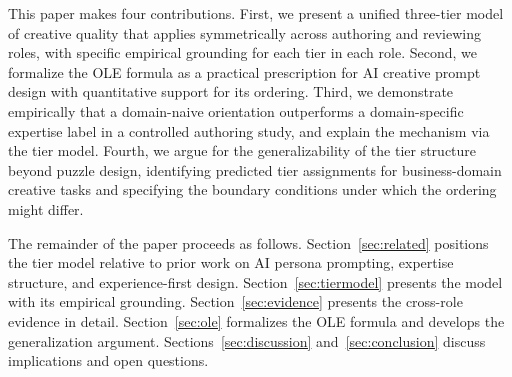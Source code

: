 This paper makes four contributions. First, we present a unified three-tier model of
creative quality that applies symmetrically across authoring and reviewing roles, with
specific empirical grounding for each tier in each role. Second, we formalize the OLE
formula as a practical prescription for AI creative prompt design with quantitative
support for its ordering. Third, we demonstrate empirically that a domain-naive
orientation outperforms a domain-specific expertise label in a controlled authoring
study, and explain the mechanism via the tier model. Fourth, we argue for the
generalizability of the tier structure beyond puzzle design, identifying predicted tier
assignments for business-domain creative tasks and specifying the boundary conditions
under which the ordering might differ.

The remainder of the paper proceeds as follows. Section~\ref{sec:related} positions the
tier model relative to prior work on AI persona prompting, expertise structure, and
experience-first design. Section~\ref{sec:tiermodel} presents the model with its
empirical grounding. Section~\ref{sec:evidence} presents the cross-role evidence in
detail. Section~\ref{sec:ole} formalizes the OLE formula and develops the
generalization argument. Sections~\ref{sec:discussion} and~\ref{sec:conclusion} discuss
implications and open questions.
